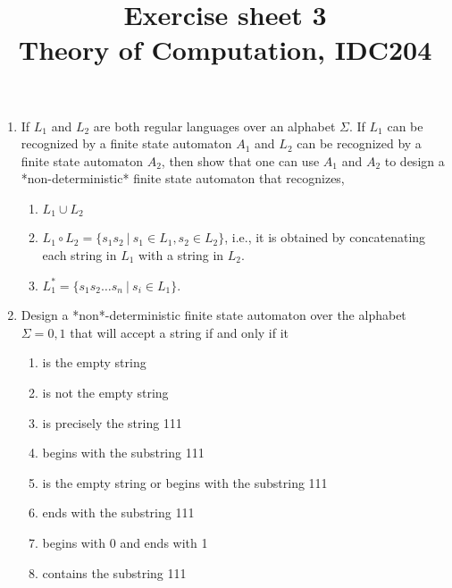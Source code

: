 \documentclass[a4paper]{article}
\title{Exercise sheet 3\\ {\small Theory of Computation, IDC204} }
\date{}
\begin{document}
\maketitle
\begin{enumerate}
\item If $L_1$ and $L_2$ are both regular languages over an alphabet $\Sigma$. If $L_1$ can be recognized by a finite state automaton $A_1$ and $L_2$ can be recognized by a finite state automaton $A_2$, then show that one can use $A_1$ and $A_2$ to design a *non-deterministic* finite state automaton that recognizes,
  \begin{enumerate}
   \item $L_1 \cup L_2$
   \item $L_1 \circ L_2 = \{s_1s_2 \ |\ s_1 \in L_1, s_2 \in L_2\}$, i.e., it is obtained by concatenating each string in $L_1$ with a string in $L_2$.
   \item $L_1^* = \{s_1s_2\ldots s_n \ |\ s_i \in L_1\}$.
  \end{enumerate}

  
\item Design a *non*-deterministic finite state automaton over the alphabet $\Sigma={0,1}$ that will accept a string if and only if it
  \begin{enumerate}
    \item is the empty string
    \item is not the empty string
    \item is precisely the string 111
\item begins with the substring 111
\item is the empty string or begins with the substring 111
\item ends with the substring 111
\item begins with 0 and ends with 1
\item contains the substring 111 
  \end{enumerate}
\end{enumerate}
\end{document}
